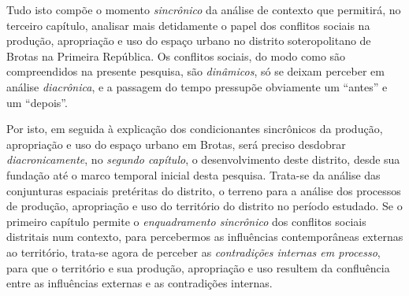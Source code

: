 Tudo isto compõe o momento \textit{sincrônico} da análise de contexto que permitirá, no terceiro capítulo, analisar mais detidamente o papel dos conflitos sociais na produção, apropriação e uso do espaço urbano no distrito soteropolitano de Brotas na Primeira República. Os conflitos sociais, do modo como são compreendidos na presente pesquisa, são \textit{dinâmicos}, só se deixam perceber em análise \textit{diacrônica}, e a passagem do tempo pressupõe obviamente um ``antes'' e um ``depois''.

Por isto, em seguida à explicação dos condicionantes sincrônicos da produção, apropriação e uso do espaço urbano em Brotas, será preciso desdobrar \textit{diacronicamente}, no \textit{segundo capítulo}, o desenvolvimento deste distrito, desde sua fundação até o marco temporal inicial desta pesquisa. Trata-se da análise das conjunturas espaciais pretéritas do distrito, o terreno para a análise dos processos de produção, apropriação e uso do território do distrito no período estudado. Se o primeiro capítulo permite o \textit{enquadramento sincrônico} dos conflitos sociais distritais num contexto, para percebermos as influências contemporâneas externas ao território, trata-se agora de perceber as \textit{contradições internas em processo}, para que o território e sua produção, apropriação e uso resultem da confluência entre as influências externas e as contradições internas. 

